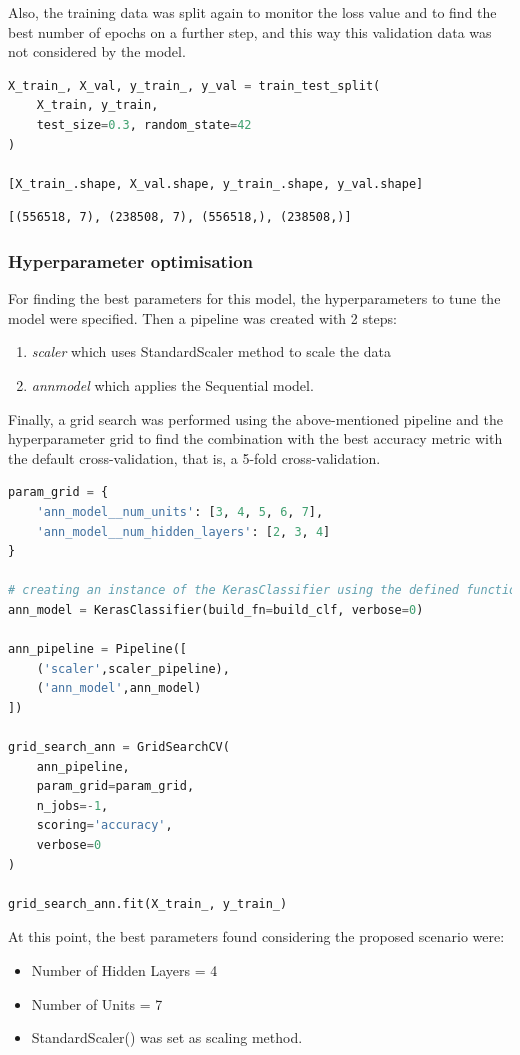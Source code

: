\documentclass{article}
\begin{document}
Also, the training data was split again to monitor the loss value and to find the best number of epochs on a further step, and this way this validation data was not considered by the model.

\begin{lstlisting}[language=Python]
X_train_, X_val, y_train_, y_val = train_test_split(
    X_train, y_train, 
    test_size=0.3, random_state=42
)

[X_train_.shape, X_val.shape, y_train_.shape, y_val.shape]
\end{lstlisting}
\begin{verbatim}
[(556518, 7), (238508, 7), (556518,), (238508,)]
\end{verbatim}

\subsubsection{Hyperparameter optimisation}
For finding the best parameters for this model, the hyperparameters to tune the model were specified. Then a pipeline was created with 2 steps:
\begin{enumerate}
\item \emph{scaler} which uses StandardScaler method to scale the data
\item \emph{annmodel} which applies the Sequential model.
\end{enumerate}

Finally, a grid search was performed using the above-mentioned pipeline and the hyperparameter grid to find the combination with the best accuracy metric with the default cross-validation, that is, a 5-fold cross-validation.
\begin{lstlisting}[language=Python]
param_grid = {
    'ann_model__num_units': [3, 4, 5, 6, 7],
    'ann_model__num_hidden_layers': [2, 3, 4]
}

# creating an instance of the KerasClassifier using the defined function 
ann_model = KerasClassifier(build_fn=build_clf, verbose=0)

ann_pipeline = Pipeline([
    ('scaler',scaler_pipeline), 
    ('ann_model',ann_model)
])

grid_search_ann = GridSearchCV(
    ann_pipeline,
    param_grid=param_grid,
    n_jobs=-1,
    scoring='accuracy',
    verbose=0
)

grid_search_ann.fit(X_train_, y_train_)
\end{lstlisting}

At this point, the best parameters found considering the proposed scenario were:
\begin{itemize}
    \item Number of Hidden Layers = 4
    \item Number of Units = 7
    \item StandardScaler() was set as scaling method.
\end{itemize}    
\end{document}

